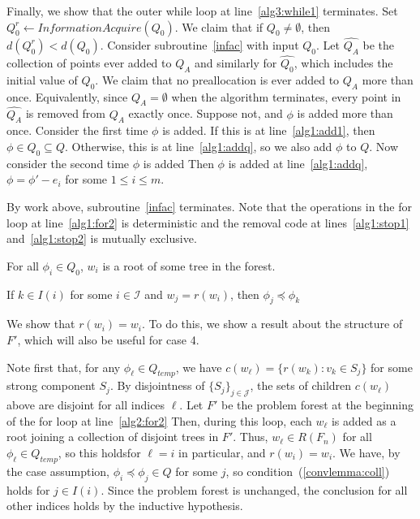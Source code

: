 \documentclass[11pt,reqno]{amsart}
\theoremstyle{definition}
\numberwithin{equation}{section}
\newcommand{\wh}{\widehat}
\newcommand{\pre}{\phi}
\newcommand{\sub}{\subseteq}
\newcommand{\peq}{\preceq}
\newcommand{\strongcomp}{S}
\newcommand{\acto}{Q_0}
\newcommand{\acta}{Q_A}
\newcommand{\act}{Q}
\newcommand{\actt}{Q_{temp}}
\newcommand{\actacum}{\wh{Q_A}}
\newcommand{\actocum}{\wh{Q_0}}
\newcommand{\coll}{I}
\newcommand{\forest}{F}
\newcommand{\roott}{R}
\begin{document}
Finally, we show that the outer while loop at line~\ref{alg3:while1} terminates.
Set $\acto^r \leftarrow InformationAcquire(\acto)$. 
We claim that if $\acto \not = \emptyset$, then $d(\acto^r) < d(\acto)$. 
Consider subroutine~\ref{infac} with input $\acto$. 
Let $\actacum$ be the collection of points ever added to $\acta$ and similarly for $\actocum$, which includes the initial value of $\acto$. 
We claim that no preallocation is ever added to $\acta$ more than once. 
Equivalently, since $\acta = \emptyset$ when the algorithm terminates, every point in $\actacum$ is removed from $\acta$ exactly once. 
Suppose not, and $\pre$ is added more than once. 
Consider the first time $\pre$ is added. 
If this is at line~\ref{alg1:add1}, then $\pre \in \acto \sub \act$.
Otherwise, this is at line~\ref{alg1:addq}, so we also add $\pre$ to $\act$.
Now consider the second time $\pre$ is added 
Then $\pre$ is added at line~\ref{alg1:addq}, $\pre = \pre' - e_i$ for some $1 \leq i \leq m$.


By work above, subroutine~\ref{infac} terminates.
Note that the operations in the for loop at line~\ref{alg1:for2} is deterministic and the removal code at lines~\ref{alg1:stop1} and~\ref{alg1:stop2} is mutually exclusive. 

\item For all $\pre_i \in \acto$, $w_i$ is a root of some tree in the forest.

\item If $k \in \coll(i)$ for some $i \in \mathcal{I}$ and $w_j = r(w_i)$, then $\pre_j \peq \pre_k$ \label{lemma:coll}

We show that $r(w_i) = w_i$. 
To do this, we show a result about the structure of $\forest'$, which will also be useful for case 4. 

Note first that, for any $\pre_{\ell} \in \actt$, we have $c(w_{\ell}) = \{r(w_k): v_k \in \strongcomp_j\}$ for some strong component $\strongcomp_j$. 
By disjointness of $\{\strongcomp_j\}_{j \in \mathcal{J}}$, the sets of children $c(w_{\ell})$ above are disjoint for all indices $\ell$. %
Let $\forest'$ be the problem forest at the beginning of the for loop at line~\ref{alg2:for2}
Then, during this loop, each $w_{\ell}$ is added as a root joining a collection of disjoint trees in $\forest'$. 
Thus, $w_{\ell} \in \roott(F_n)$ for all $\pre_{\ell} \in \actt$, so this holdsfor $\ell = i$ in particular, and $r(w_i) = w_i$. 
We have, by the case assumption, $\pre_i \peq \pre_j \in \act$ for some $j$, so  condition~(\ref{convlemma:coll}) holds for $j \in \coll(i)$. 
Since the problem forest is unchanged, the conclusion for all other indices holds by the inductive hypothesis. 
\end{document}
